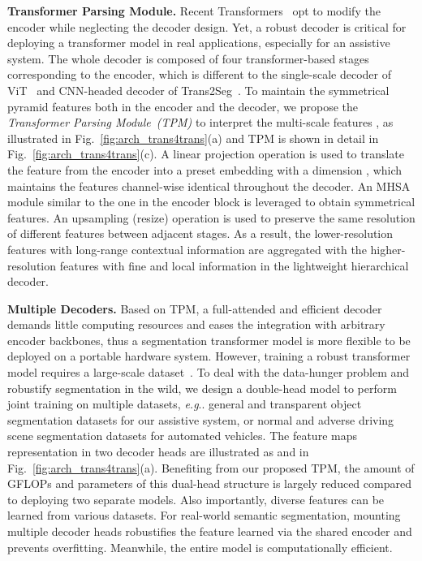 \documentclass[journal]{IEEEtran}
\makeatletter
\DeclareRobustCommand\onedot{\futurelet\@let@token\@onedot}
\def\@onedot{\ifx\@let@token.\else.\null\fi\xspace}
\def\eg{\emph{e.g}\onedot} \def\Eg{\emph{E.g}\onedot}
\makeatother
\begin{document}
\noindent \textbf{Transformer Parsing Module.}
Recent Transformers~\cite{setr}\cite{swin}\cite{twins} opt to modify the encoder while neglecting the decoder design. Yet, a robust decoder is critical for deploying a transformer model in real applications, especially for an assistive system. The whole decoder is composed of four transformer-based stages corresponding to the encoder, which is different to the single-scale decoder of ViT~\cite{vit} and CNN-headed decoder of Trans2Seg~\cite{xie2021segmenting}. To maintain the symmetrical pyramid features both in the encoder and the decoder, we propose the \emph{Transformer Parsing Module~(TPM)} to interpret the multi-scale features , as illustrated in Fig.~\ref{fig:arch_trans4trans}(a) and TPM is shown in detail in Fig.~\ref{fig:arch_trans4trans}(c). A linear projection operation is used to translate the feature from the encoder into a preset embedding with a dimension , which maintains the features channel-wise identical throughout the decoder. An MHSA module similar to the one in the encoder block is leveraged to obtain symmetrical features. An upsampling (resize) operation is used to preserve the same resolution  of different features between adjacent stages. As a result, the lower-resolution features with long-range contextual information are aggregated with the higher-resolution features with fine and local information in the lightweight hierarchical decoder.

\noindent \textbf{Multiple Decoders.}
Based on TPM, a full-attended and efficient decoder demands little computing resources and eases the integration with arbitrary encoder backbones, thus a segmentation transformer model is more flexible to be deployed on a portable hardware system. However, training a robust transformer model requires a large-scale dataset~\cite{vit}. To deal with the data-hunger problem and robustify segmentation in the wild, we design a double-head model to perform joint training on multiple datasets, \eg general and transparent object segmentation datasets for our assistive system, or normal and adverse driving scene segmentation datasets for automated vehicles. The feature maps representation in two decoder heads are illustrated as  and  in Fig.~\ref{fig:arch_trans4trans}(a).
Benefiting from our proposed TPM, the amount of GFLOPs and parameters of this dual-head structure is largely reduced compared to deploying two separate models. Also importantly, diverse features can be learned from various datasets.
For real-world semantic segmentation, mounting multiple decoder heads robustifies the feature learned via the shared encoder and prevents overfitting. Meanwhile, the entire model is computationally efficient.
\end{document}
